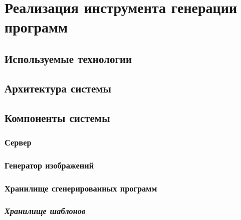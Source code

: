 \section{Реализация инструмента генерации программ}

\subsection{Используемые технологии}
\subsection{Архитектура системы}

\subsection{Компоненты системы}
\subsubsection{Сервер}
\subsubsection{Генератор изображений}
\subsubsection{Хранилище сгенерированных программ}
\subsubsection{\textit{Хранилище шаблонов}}
